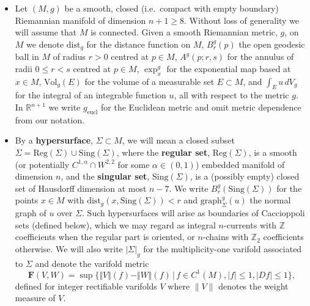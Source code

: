 \documentclass[12pt]{article}
\begin{document}
\begin{itemize}
    \item Let $(M,g)$ be a smooth, closed (i.e.~compact with empty boundary) Riemannian manifold of dimension $n+1 \geq 8$. Without loss of generality we will assume that $M$ is connected. Given a smooth Riemannian metric, $g$, on $M$ we denote $\mathrm{dist}_g$ for the distance function on $M$, $B^g_r(p)$ the open geodesic ball in $M$ of radius $r > 0$ centred at $p \in M$, $A^g(p;r,s)$ for the annulus of radii $0 \leq r < s$ centred at $p \in M$, $\exp_x^g$ for the exponential map based at $x \in M$, $\mathrm{Vol}_g(E)$ for the volume of a measurable set $E \subset M$, and $\int_E u \, dV_g$ for the integral of an integrable function $u$, all with respect to the metric $g$. In $\mathbb{R}^{n+1}$ we write $g_\mathrm{eucl}$ for the Euclidean metric and omit metric dependence from our notation.

    \item By a \textbf{hypersurface}, $\Sigma \subset M$, we will mean a closed subset $\Sigma = \mathrm{Reg}(\Sigma) \cup \mathrm{Sing}(\Sigma)$, where the \textbf{regular set}, $\mathrm{Reg}(\Sigma)$, is a smooth (or potentially $C^{1,\alpha} \cap W^{2,2}$ for some $\alpha \in (0,1)$) embedded manifold of dimension $n$, and the \textbf{singular set}, $\mathrm{Sing}(\Sigma)$, is a (possibly empty) closed set of Hausdorff dimension at most $n-7$. We write $B_r^g(\mathrm{Sing}(\Sigma))$ for the points $x \in M$ with $\mathrm{dist}_g(x,\mathrm{Sing}(\Sigma)) < r$ and $\mathrm{graph}_\Sigma^g(u)$ the normal graph of $u$ over $\Sigma$. Such hypersurfaces will arise as boundaries of Caccioppoli sets (defined below), which we may regard as integral $n$-currents with $\mathbb{Z}$ coefficients when the regular part is oriented, or $n$-chains with $\mathbb{Z}_2$ coefficients otherwise. We will also write $|\Sigma|_g$ for the multiplicity-one varifold associated to $\Sigma$ and denote the varifold metric
    \begin{equation*}
        \mathbf{F}(V, W) = \sup\{\Vert V \Vert(f) - \Vert W \Vert(f) \, | \, f \in C^1(M), \vert f \vert \leq 1, \vert Df \vert \leq 1 \}, 
    \end{equation*}
    defined for integer rectifiable varifolds $V$ where $\|V\|$ denotes the weight measure of $V$.



\end{itemize}
\end{document}
